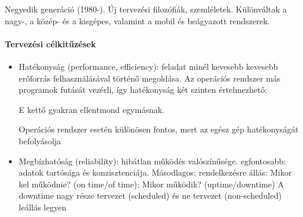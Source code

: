 \documentclass[fleqn,10pt,a4paper]{article}
\theoremstyle{magyar}
\begin{document}
  Negyedik generáció (1980-). Új tervezési filozófiák, szemléletek. Különváltak a nagy-, a közép- és a kisgépes,
  valamint a mobil és beágyazott rendszerek.


  \paragraph{Tervezési célkitűzések}
  \begin{itemize}
  \item Hatékonyság (performance, efficiency): feladat minél kevesebb kevesebb erőforrás felhasználásával történő
    megoldása. Az operációs rendszer más programok futását vezérli, így hatékonyság két szinten értelmezhető:\\
     E kettő gyakran ellentmond egymásnak.
    
    Operációs rendszer esetén különösen fontos, mert az egész gép hatékonyságát befolyásolja 
    
  \item Megbízhatóság (reliability): hibátlan működés valószínűsége. egfontosabb: adatok tartósága és
    konzisztenciája. Másodlagos: rendelkezésre állás: Mikor kel működnie? (on time/of time); Mikor működik? (uptime/downtime)
    A downtime nagy része tervezet (scheduled) és ne tervezet (non-scheduled) leállás legyen 


\end{itemize}
\end{document}
